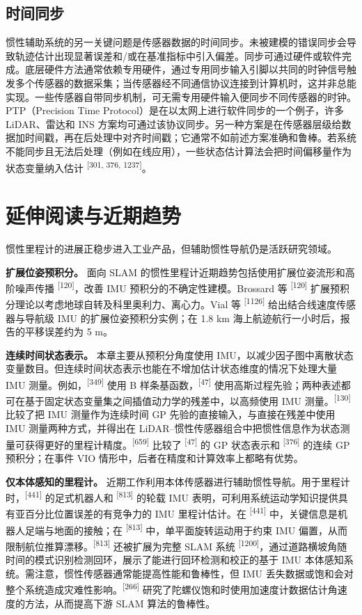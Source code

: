\subsection{时间同步}

惯性辅助系统的另一关键问题是传感器数据的时间同步。未被建模的错误同步会导致轨迹估计出现显著误差和/或在基准指标中引入偏差。同步可通过硬件或软件完成。底层硬件方法通常依赖专用硬件，通过专用同步输入引脚以共同的时钟信号触发多个传感器的数据采集；当传感器经不同通信协议连接到计算机时，这并非总能实现。一些传感器自带同步机制，可无需专用硬件输入便同步不同传感器的时钟。PTP（Precision Time Protocol）是在以太网上进行软件同步的一个例子，许多 LiDAR、雷达和 INS 方案均可通过该协议同步。另一种方案是在传感器层级给数据加时间戳，再在后处理中对齐时间戳；它通常不如前述方案准确和鲁棒。若系统不能同步且无法后处理（例如在线应用），一些状态估计算法会把时间偏移量作为状态变量纳入估计 \textsuperscript{[301, 376, 1237]}。

\section{延伸阅读与近期趋势}

惯性里程计的进展正稳步进入工业产品，但辅助惯性导航仍是活跃研究领域。

\textbf{扩展位姿预积分。} 面向 SLAM 的惯性里程计近期趋势包括使用扩展位姿流形和高阶噪声传播 \textsuperscript{[120]}，改善 IMU 预积分的不确定性建模。Brossard 等 \textsuperscript{[120]} 扩展预积分理论以考虑地球自转及科里奥利力、离心力。Vial 等 \textsuperscript{[1126]} 给出结合线速度传感器与导航级 IMU 的扩展位姿预积分实例；在 1.8 km 海上航迹航行一小时后，报告的平移误差约为 5 m。

\textbf{连续时间状态表示。} 本章主要从预积分角度使用 IMU，以减少因子图中离散状态变量数目。但连续时间状态表示也能在不增加估计状态维度的情况下处理大量 IMU 测量。例如，\textsuperscript{[349]} 使用 B 样条基函数，\textsuperscript{[47]} 使用高斯过程先验；两种表述都可在基于固定状态变量集之间插值动力学的残差中，以高频使用 IMU 测量。\textsuperscript{[130]} 比较了把 IMU 测量作为连续时间 GP 先验的直接输入，与直接在残差中使用 IMU 测量两种方式，并得出在 LiDAR--惯性传感器组合中把惯性信息作为状态测量可获得更好的里程计精度。\textsuperscript{[659]} 比较了 \textsuperscript{[47]} 的 GP 状态表示和 \textsuperscript{[376]} 的连续 GP 预积分；在事件 VIO 情形中，后者在精度和计算效率上都略有优势。

\textbf{仅本体感知的里程计。} 近期工作利用本体传感器进行辅助惯性导航。用于里程计时，\textsuperscript{[441]} 的足式机器人和 \textsuperscript{[813]} 的轮载 IMU 表明，可利用系统运动学知识提供具有亚百分比位置误差的有竞争力的 IMU 里程计估计。在 \textsuperscript{[441]} 中，关键信息是机器人足端与地面的接触；在 \textsuperscript{[813]} 中，单平面旋转运动用于约束 IMU 偏置，从而限制航位推算漂移。\textsuperscript{[813]} 还被扩展为完整 SLAM 系统 \textsuperscript{[1200]}，通过道路横坡角随时间的模式识别检测回环，展示了能进行回环检测和校正的基于 IMU 本体感知系统。需注意，惯性传感器通常能提高性能和鲁棒性，但 IMU 丢失数据或饱和会对整个系统造成灾难性影响。\textsuperscript{[266]} 研究了陀螺仪饱和时使用加速度计数据估计角速度的方法，从而提高下游 SLAM 算法的鲁棒性。

